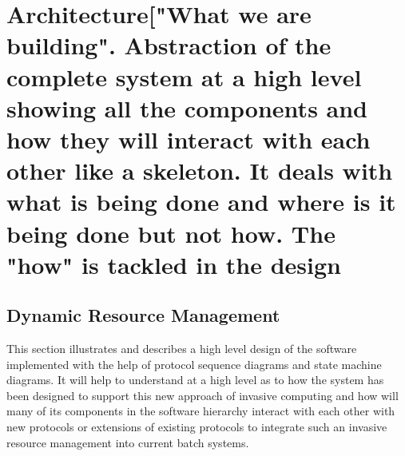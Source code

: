 \chapter{Architecture["What we are building". Abstraction of the complete system at a high level showing all the components and how they will interact with each other like a skeleton. It deals with what is being done and where is it being done but not how. The "how" is tackled in the design}\label{chapter:dynamic resource}

\section{Dynamic Resource Management}

This section illustrates and describes a high level design of the software implemented with the help of protocol sequence diagrams and state machine diagrams. It will help to understand at a high level as to how the system has been designed to support this new approach of invasive computing and how will many of its components in the software hierarchy interact with each other with new protocols or extensions of existing protocols to integrate such an invasive resource management into current batch systems.\\

